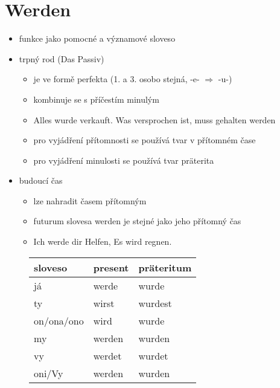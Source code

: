 \documentclass[a4paper,12pt]{report}
\begin{document}
\section{Werden}

\begin{itemize}
  \item funkce jako pomocné a významové sloveso
  \item trpný rod (Das Passiv)
    \begin{itemize}
      \item je ve formě perfekta (1. a 3. osobo stejná, -e- $\Rightarrow$ -u-)
      \item kombinuje se s příčestím minulým
      \item Alles wurde verkauft. Was versprochen ist, muss gehalten werden
      \item pro vyjádření přítomnosti se používá tvar v přítomném čase
      \item pro vyjádření minulosti se používá tvar präterita
    \end{itemize}
  \item budoucí čas
    \begin{itemize}
      \item lze nahradit časem přítomným
      \item futurum slovesa werden je stejné jako jeho přítomný čas
      \item Ich werde dir Helfen, Es wird regnen.
    \end{itemize}
\end{itemize}

\begin{figure}[h]
  \centering
  \begin{center}
    \begin{longtable}{ | m{2cm} | m{2cm}| m{2cm} |}
      \hline
      sloveso    & present & präteritum \\
      \hline
      já         & werde   & wurde      \\
      ty         & wirst   & wurdest    \\
      on/ona/ono & wird    & wurde      \\
      my         & werden  & wurden     \\
      vy         & werdet  & wurdet     \\
      oni/Vy     & werden  & wurden     \\
      \hline
    \end{longtable}
  \end{center}
\end{figure}
\end{document}
